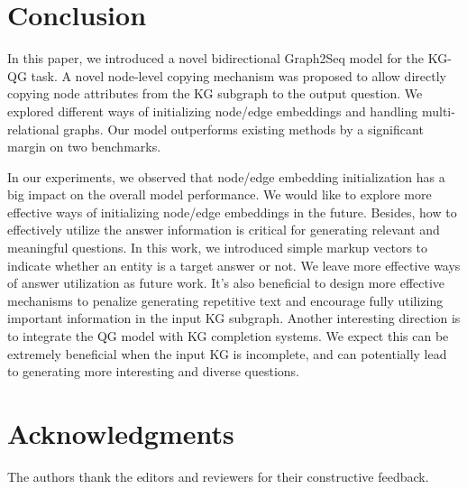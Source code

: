 \documentclass[journal]{IEEEtran}
\begin{document}
\section{Conclusion}

In this paper, we introduced a novel bidirectional Graph2Seq model for the KG-QG task.
A novel node-level copying mechanism was proposed to allow directly copying node attributes from the KG subgraph to the output question.
We explored different ways of initializing node/edge embeddings and handling multi-relational graphs.
Our model outperforms existing methods by a significant margin on two benchmarks. 



In our experiments, we observed that node/edge embedding initialization has a big impact on the overall model performance. 
We would like to explore more effective ways of initializing node/edge embeddings in the future.
Besides, how to effectively utilize the answer information is critical for generating relevant and meaningful questions. In this work, we introduced simple markup vectors to indicate whether an entity is a target answer or not. We leave more effective ways of answer utilization as future work.
It's also beneficial to design more effective mechanisms to penalize generating repetitive text and encourage fully utilizing important information in the input KG subgraph.
Another interesting direction is to integrate the QG model with KG completion systems. We expect this can be extremely beneficial when the input KG is incomplete, and can potentially lead to generating more interesting and diverse questions.


\section*{Acknowledgments}

The authors thank the editors and reviewers for their constructive feedback.






\end{document}
